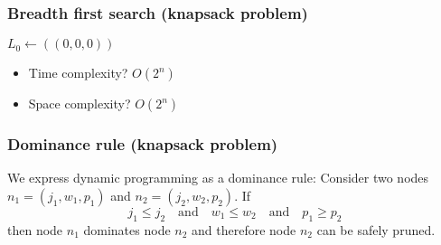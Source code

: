 \documentclass{beamer}
\begin{document}
\begin{frame}
\begin{center}
  \end{center}
\end{frame}

\begin{frame}
  \frametitle{Breadth first search (knapsack problem)}

  \begin{algorithmic}
    \State$L_0 \gets ((0, 0, 0))$
    \EndIf
    \EndFor
    \EndFor
    \EndProcedure{}
  \end{algorithmic}

  \begin{itemize}
    \item \pause Time complexity? \pause $O(2^n)$
    \item \pause Space complexity? \pause $O(2^n)$
  \end{itemize}

\end{frame}

\begin{frame}
  \frametitle{Dominance rule (knapsack problem)}

  We express dynamic programming as a dominance rule:
  Consider two nodes $n_1 = (j_1, w_1, p_1)$ and $n_2 = (j_2, w_2, p_2)$.
  If
  \begin{displaymath}
    j_1 \le j_2 \quad \text{and} \quad w_1 \le w_2 \quad \text{and} \quad p_1 \ge p_2
  \end{displaymath}
  then node $n_1$ dominates node $n_2$ and therefore node $n_2$ can be safely pruned.
\end{frame}
\end{document}
